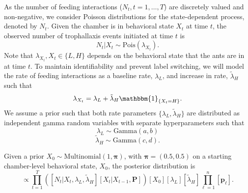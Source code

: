 \documentclass[smallextended]{svjour3}       %
\begin{document}
As the number of feeding interactions ($N_t, t = 1, \dots, T$) are discretely valued and non-negative, we consider Poisson distributions for the state-dependent process, denoted by $N_t$. Given the chamber is in behavioral state $X_t$ at time $t$, the observed number of trophallaxis events initiated at time $t$ is
\begin{equation}
N_t | X_t \sim \text{Pois}(\lambda_{X_t}).
\label{e:NgivenX}
\end{equation}
Note that $\lambda_{X_t}, X_t \in \{L, H\}$ depends on the behavioral state that the ants are in at time $t$. To maintain identifiability and prevent label switching, we will model the rate of feeding interactions as a baseline rate, $\lambda_L$, and increase in rate, $\tilde{\lambda}_H$ such that
\begin{equation}
\lambda_{X_t} = \lambda_L + \tilde{\lambda}_H \mathbbm{1}_{\{X_t = H\}}.
\label{e:lambdasplit}
\end{equation}
We assume a prior such that both rate parameters $\{\lambda_L, \tilde{\lambda}_H\}$ are distributed as independent gamma random variables with separate hyperparameters such that
\begin{equation}
\lambda_L \sim \text{Gamma}(a, b)
\end{equation}
\begin{equation}
\tilde{\lambda}_H \sim \text{Gamma}(c, d).
\end{equation}


Given a prior $X_0 \sim \text{Multinomial}(1, \bm{\pi})$, with $\bm{\pi} = (0.5, 0.5)$ on a starting chamber-level behavioral state, $X_0$, the posterior distribution is
\begin{equation}
[\{X_t\}, \{\lambda_L, \tilde{\lambda}_H\}, \mathbf{P} | \{N_t\} ] \propto \prod_{t = 1}^T \left( [N_t | X_t, \lambda_L, \tilde{\lambda}_H] [X_t | X_{t-1}, \mathbf{P}] \right) [X_0][\lambda_L] [\tilde{\lambda}_H] \prod^n_{\ell = 1}[\mathbf{p}_\ell].
\end{equation}


\end{document}
